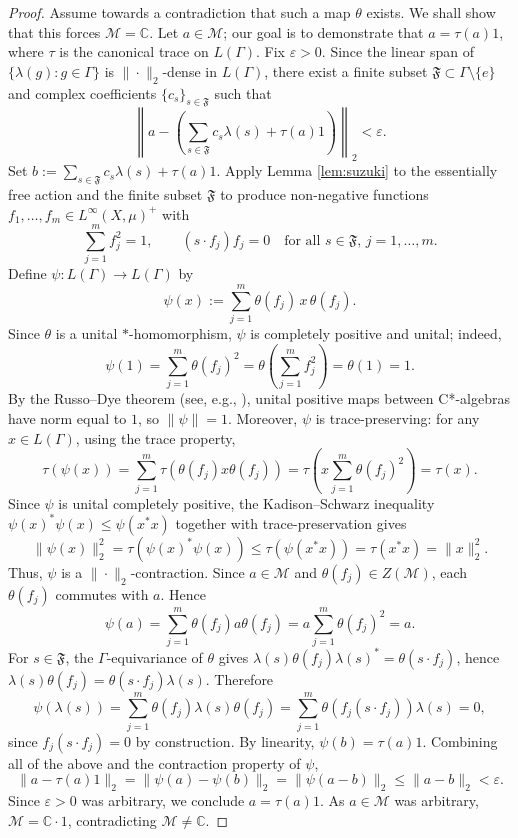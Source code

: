 \documentclass[11pt]{amsart}
\theoremstyle{definition}
\newcommand{\C}{\mathbb{C}}
\newcommand{\cM}{\mathcal{M}}
\newcommand{\fF}{\mathfrak{F}}
\begin{document}
\begin{proof}
Assume towards a contradiction that such a map $\theta$ exists. We shall show that this forces $\cM = \C$. Let $a \in \cM$; our goal is to demonstrate that $a = \tau(a) 1$, where $\tau$ is the canonical trace on $L(\Gamma)$. Fix $\varepsilon > 0$. Since the linear span of $\{\lambda(g) : g \in \Gamma\}$ is $\|\cdot\|_2$-dense in $L(\Gamma)$, there exist a finite subset $\fF \subset \Gamma \setminus \{e\}$ and complex coefficients $\{c_s\}_{s \in \fF}$ such that
\[
\left\| a - \left( \sum_{s \in \fF} c_s \lambda(s) + \tau(a) 1 \right) \right\|_2 < \varepsilon.
\]
Set $b := \sum_{s \in \fF} c_s \lambda(s) + \tau(a) 1$.
Apply Lemma \ref{lem:suzuki} to the essentially free action and the finite subset $\fF$ to produce non-negative functions $f_1, \dots, f_m \in L^\infty(X, \mu)^+$ with
\[
\sum_{j=1}^m f_j^2 = 1, \qquad (s \cdot f_j) f_j = 0 \quad \text{for all } s \in \fF, \, j = 1, \dots, m.
\]
Define $\psi \colon L(\Gamma) \to L(\Gamma)$ by
\[
\psi(x) := \sum_{j=1}^m \theta(f_j) \, x \, \theta(f_j).
\]
Since $\theta$ is a unital $*$-homomorphism, $\psi$ is completely positive and unital; indeed,
\[
\psi(1) = \sum_{j=1}^m \theta(f_j)^2 = \theta\!\left( \sum_{j=1}^m f_j^2 \right) = \theta(1) = 1.
\]
By the Russo--Dye theorem (see, e.g., \cite[Corollary 2.9]{Paulsen02}), unital positive maps between C*-algebras have norm equal to $1$, so $\|\psi\| = 1$. Moreover, $\psi$ is trace-preserving: for any $x \in L(\Gamma)$, using the trace property,
\[
\tau(\psi(x)) = \sum_{j=1}^m \tau(\theta(f_j) x \theta(f_j)) = \tau\!\left( x \sum_{j=1}^m \theta(f_j)^2 \right) = \tau(x).
\]
Since $\psi$ is unital completely positive, the Kadison--Schwarz inequality $\psi(x)^* \psi(x) \le \psi(x^* x)$ together with trace-preservation gives
\[
\|\psi(x)\|_2^2 = \tau(\psi(x)^* \psi(x)) \le \tau(\psi(x^* x)) = \tau(x^* x) = \|x\|_2^2.
\]
Thus, $\psi$ is a $\|\cdot\|_2$-contraction. Since $a \in \cM$ and $\theta(f_j) \in Z(\cM)$, each $\theta(f_j)$ commutes with $a$. Hence
\[
\psi(a) = \sum_{j=1}^m \theta(f_j) a \theta(f_j) = a \sum_{j=1}^m \theta(f_j)^2 = a.
\]
For $s \in \fF$, the $\Gamma$-equivariance of $\theta$ gives $\lambda(s) \theta(f_j) \lambda(s)^* = \theta(s \cdot f_j)$, hence $\lambda(s) \theta(f_j) = \theta(s \cdot f_j) \lambda(s)$. Therefore
\[
\psi(\lambda(s)) = \sum_{j=1}^m \theta(f_j) \lambda(s) \theta(f_j) = \sum_{j=1}^m \theta(f_j (s \cdot f_j)) \lambda(s) = 0,
\]
since $f_j (s \cdot f_j) = 0$ by construction. By linearity, $\psi(b) = \tau(a) 1$. Combining all of the above and the contraction property of $\psi$,
\[
\|a - \tau(a) 1\|_2 = \|\psi(a) - \psi(b)\|_2 = \|\psi(a - b)\|_2 \le \|a - b\|_2 < \varepsilon.
\]
Since $\varepsilon > 0$ was arbitrary, we conclude $a = \tau(a) 1$. As $a \in \cM$ was arbitrary, $\cM = \C \cdot 1$, contradicting $\cM \neq \C$.
\end{proof}
\end{document}
